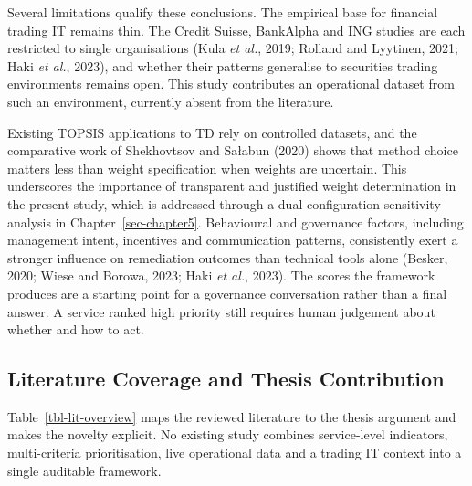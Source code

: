 \documentclass[
  12pt,
  letterpaper,
  12pt,
  oneside,
  english,
  onehalfspacing,
  headsepline]{MastersDoctoralThesis}
\begin{document}
Several limitations qualify these conclusions. The empirical base for
financial trading IT remains thin. The Credit Suisse, BankAlpha and ING
studies are each restricted to single organisations (Kula \emph{et al.},
2019; Rolland and Lyytinen, 2021; Haki \emph{et al.}, 2023), and whether
their patterns generalise to securities trading environments remains
open. This study contributes an operational dataset from such an
environment, currently absent from the literature.

Existing TOPSIS applications to TD rely on controlled datasets, and the
comparative work of Shekhovtsov and Sałabun (2020) shows that method
choice matters less than weight specification when weights are
uncertain. This underscores the importance of transparent and justified
weight determination in the present study, which is addressed through a
dual-configuration sensitivity analysis in Chapter~\ref{sec-chapter5}.
Behavioural and governance factors, including management intent,
incentives and communication patterns, consistently exert a stronger
influence on remediation outcomes than technical tools alone (Besker,
2020; Wiese and Borowa, 2023; Haki \emph{et al.}, 2023). The scores the
framework produces are a starting point for a governance conversation
rather than a final answer. A service ranked high priority still
requires human judgement about whether and how to act.

\subsection{Literature Coverage and Thesis
Contribution}\label{literature-coverage-and-thesis-contribution}

Table~\ref{tbl-lit-overview} maps the reviewed literature to the thesis
argument and makes the novelty explicit. No existing study combines
service-level indicators, multi-criteria prioritisation, live
operational data and a trading IT context into a single auditable
framework.
\end{document}
